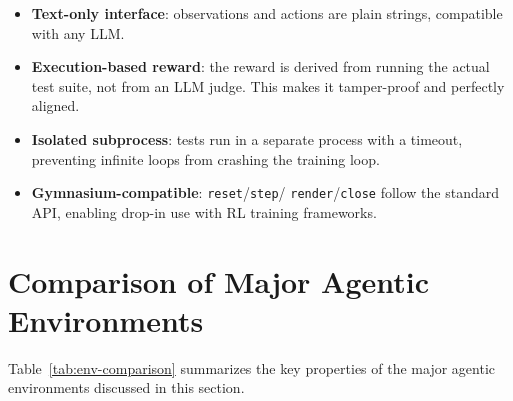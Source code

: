 \begin{keybox}
\begin{itemize}
  \item \textbf{Text-only interface}: observations and actions are plain strings, compatible with any LLM.
  \item \textbf{Execution-based reward}: the reward is derived from running the actual test suite, not from an LLM judge. This makes it tamper-proof and perfectly aligned.
  \item \textbf{Isolated subprocess}: tests run in a separate process with a timeout, preventing infinite loops from crashing the training loop.
  \item \textbf{Gymnasium-compatible}: \texttt{reset}/\texttt{step}/ \texttt{render}/\texttt{close} follow the standard API, enabling drop-in use with RL training frameworks.
\end{itemize}
\end{keybox}

\section{Comparison of Major Agentic Environments}
\label{sec:env-comparison}

Table~\ref{tab:env-comparison} summarizes the key properties of the major agentic environments discussed in this section.


